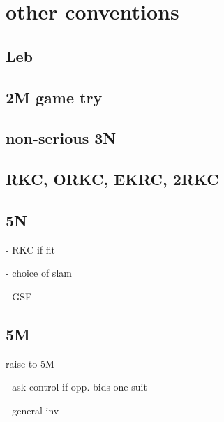 \section{other conventions}

\subsection{Leb}

\subsection{2M game try}


\subsection{non-serious 3N}

\subsection{RKC, ORKC, EKRC, 2RKC}

\subsection{5N}

- RKC if fit

- choice of slam

- GSF

\subsection{5M}

raise to 5M

- ask control if opp. bids one suit

- general inv
